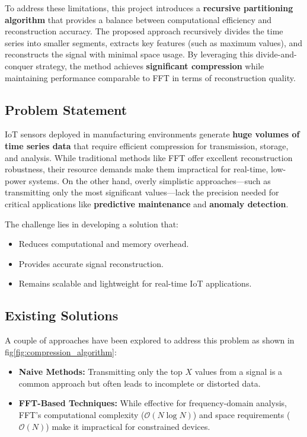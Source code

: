 \documentclass[onecolumn,conference]{IEEEtran}
\begin{document}
To address these limitations, this project introduces a \textbf{recursive partitioning algorithm} that provides a balance between computational efficiency and reconstruction accuracy. The proposed approach recursively divides the time series into smaller segments, extracts key features (such as maximum values), and reconstructs the signal with minimal space usage. By leveraging this divide-and-conquer strategy, the method achieves \textbf{significant compression} while maintaining performance comparable to FFT in terms of reconstruction quality.

\subsection{Problem Statement}
IoT sensors deployed in manufacturing environments generate \textbf{huge volumes of time series data} that require efficient compression for transmission, storage, and analysis. While traditional methods like FFT offer excellent reconstruction robustness, their resource demands make them impractical for real-time, low-power systems. On the other hand, overly simplistic approaches—such as transmitting only the most significant values—lack the precision needed for critical applications like \textbf{predictive maintenance} and \textbf{anomaly detection}.

The challenge lies in developing a solution that:
\begin{itemize}
    \item Reduces computational and memory overhead.
    \item Provides accurate signal reconstruction.
    \item Remains scalable and lightweight for real-time IoT applications.
\end{itemize}

\subsection{Existing Solutions}
A couple of approaches have been explored to address this problem as shown in fig\ref{fig:compression_algorithm}:
\begin{itemize}
    \item \textbf{Naive Methods:} Transmitting only the top $X$ values from a signal is a common approach but often leads to incomplete or distorted data.
    \item \textbf{FFT-Based Techniques:} While effective for frequency-domain analysis, FFT’s computational complexity ($\mathcal{O}(N \log N)$) and space requirements ($\mathcal{O}(N)$) make it impractical for constrained devices.
\end{itemize}
\end{document}
